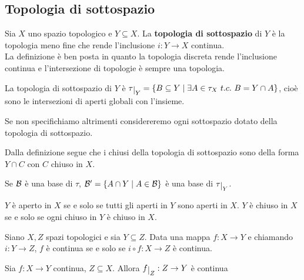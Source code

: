 \begin{multicols*}{2}
\section{Topologia di sottospazio}
\begin{definition}
Sia $X$ uno spazio topologico e $Y\subseteq X$. La \textbf{topologia di sottospazio} di $Y$ è la topologia meno fine che rende l'inclusione $i:Y\to X$ continua.\\
La definizione è ben posta in quanto la topologia discreta rende l'inclusione continua e l'intersezione di topologie è sempre una topologia.
\end{definition}
\begin{proposition}
La topologia di sottospazio di $Y$ è $\tau\res Y=\{B\subseteq Y\mid \exists A\in \tau_X\ t.c.\ B=Y\cap A\}$, cioè sono le intersezioni di aperti globali con l'insieme.
\end{proposition}

\noindent
Se non specifichiamo altrimenti considereremo ogni sottospazio dotato della topologia di sottospazio.

\begin{remark}
Dalla definizione segue che i chiusi della topologia di sottospazio sono della forma $Y\cap C$ con $C$ chiuso in $X$.
\end{remark}
\begin{remark}
Se $\mathcal{B}$ è una base di $\tau$, $\mathcal{B}'=\{A\cap Y\mid A\in \mathcal{B}\}$ è una base di $\tau\res Y$.
\end{remark}
\begin{proposition}
$Y$ è aperto in $X$ se e solo se tutti gli aperti in $Y$ sono aperti in $X$. $Y$ è chiuso in $X$ se e solo se ogni chiuso in $Y$ è chiuso in $X$.
\end{proposition}

\begin{proposition}
Siano $X,Z$ spazi topologici e sia $Y\subseteq Z$. Data una mappa $f:X\to Y$ e chiamando $i:Y\to Z$, $f$ è continua se e solo se  $i\circ f:X\to Z$ è continua.
\end{proposition}

\begin{proposition}
Sia $f:X\to Y$ continua, $Z\subseteq X$. Allora $f\res Z:Z\to Y$ è continua
\end{proposition}


\end{multicols*}
